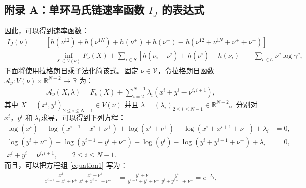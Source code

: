 \begin{appendices}

\section{附录 A：单环马氏链速率函数 $I_J$ 的表达式 }{} \label{appendix:explicit} \label{appendix:explicit}
因此，可以得到速率函数：
\begin{equation*}\label{ratefunction2}
	\begin{split}
		I_J(\nu) =&\; \left[h\left(\nu^{12}\right)+h\left(\nu^{1N}\right)
		+h\left(\nu^+\right)+h\left(\nu^-\right)-h\left(\nu^{12}+\nu^{1N}+\nu^++\nu^-\right)\right] \\
		&\;+\inf_{X\in V(\nu)}F_{\nu}(X)+\sum_{i\in S}\left[ h\left(\nu_i-\nu^i\right)+h\left(\nu^i\right)
		-h\left(\nu_i\right)\right]-\sum_{c\in\mathcal{C}}\nu^c\log\gamma^c,
	\end{split}
\end{equation*}
下面将使用拉格朗日乘子法化简该式。固定 $\nu\in\mathcal{V}$，令拉格朗日函数 \cite{brian1990optimization} $\mathcal{A}_{\nu}:V(\nu)\times \mathbb{R}^{N-2}\to \mathbb{R}$ 为：
\begin{align*}
    \mathcal{A}_{\nu}(X,\lambda) = F_{\nu}(X) + \sum_{i=2}^{N-1} \lambda_i \left(x^{i} + y^{i} - \nu^{i,i+1}\right),
\end{align*}
其中 $X=(x^i,y^i)_{2\le i\le N-1}\in V(\nu)$ 并且 $\lambda=(\lambda_i)_{2\le i\le N-1}\in \mathbb{R}^{N-2}$。分别对 $x^{i}$，$y^{i}$ 和 $\lambda_i$求导，可以得到下列方程：
\begin{equation}\label{equation1}
	\begin{split}
		\log\left(x^{i}\right) - \log\left(x^{i-1}+x^{i}+\nu^{+}\right)  + \log\left(x^{i}+\nu^{+}\right) -\log\left(x^{i}+x^{i+1}+\nu^{+}\right)+\lambda_i  &= 0, \\
		\log\left(y^{i}+\nu^{-}\right) -\log\left(y^{i-1}+y^{i}+\nu^{-}\right)  + \log\left(y^{i}\right) - \log\left(y^{i}+y^{i+1}+\nu^{-}\right) +\lambda_i &= 0, \\
		x^{i} + y^{i} = \nu^{i,i+1},\qquad 2\le i\le N-1.\qquad\qquad\qquad
	\end{split}
\end{equation}
而且，可以把方程组 \eqref{equation1} 写为：
\begin{equation}\label{equations}
    \begin{split}
    \frac{x^{i}}{x^{i-1}+x^{i}+\nu^+}
    \,\frac{x^{i}+\nu^+}{x^{i}+x^{i+1}+\nu^+}
    &= \frac{y^{i}+\nu^-}{y^{i-1}+y^{i}+\nu^-}
    \,\frac{y^{i}}{y^{i}+y^{i+1}+\nu^-}=e^{-\lambda_i},\\

\end{split}
\end{equation}
\end{appendices}
